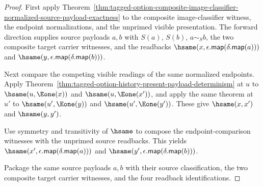 \begin{proof}
First apply
Theorem~\ref{thm:tagged-option-composite-image-classifier-normalized-source-payload-exactness}
to the composite image-classifier witness, the endpoint normalizations, and the
unprimed visible presentation. The forward direction supplies source payloads
$a,b$ with $S(a)$, $S(b)$, $a\sim_S b$, the two composite target carrier
witnesses, and the readbacks
$\hsame(x,\epsilon.\mathsf{map}(\delta.\mathsf{map}(a)))$ and
$\hsame(y,\epsilon.\mathsf{map}(\delta.\mathsf{map}(b)))$.

Next compare the competing visible readings of the same normalized endpoints.
Apply Theorem~\ref{thm:tagged-option-history-present-payload-determinism} at
$u$ to $\hsame(u,\Eone(x))$ and $\hsame(u,\Eone(x'))$, and apply the same theorem
at $u'$ to $\hsame(u',\Eone(y))$ and $\hsame(u',\Eone(y'))$. These give
$\hsame(x,x')$ and $\hsame(y,y')$.

Use symmetry and transitivity of $\hsame$ to compose the endpoint-comparison
witnesses with the unprimed source readbacks. This yields
$\hsame(x',\epsilon.\mathsf{map}(\delta.\mathsf{map}(a)))$ and
$\hsame(y',\epsilon.\mathsf{map}(\delta.\mathsf{map}(b)))$.

Package the same source payloads $a,b$ with their source classification, the two
composite target carrier witnesses, and the four readback identifications.
\end{proof}

